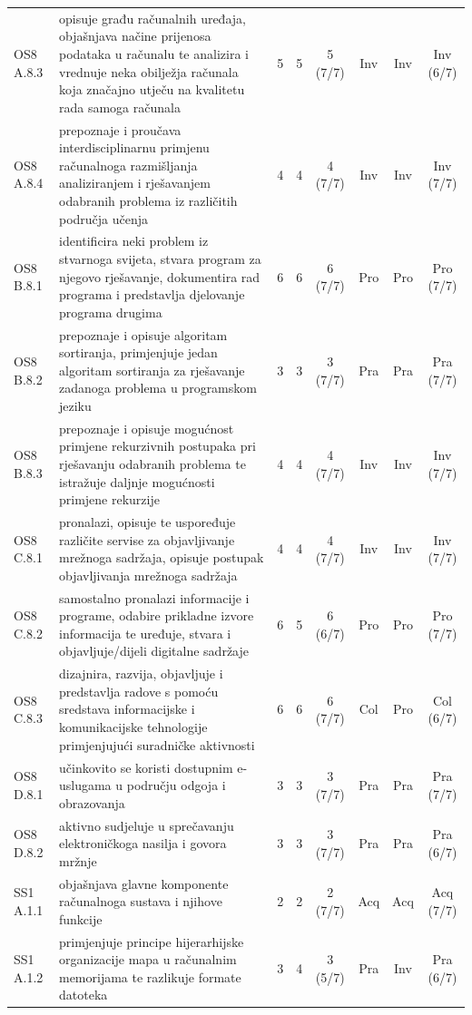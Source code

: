 \documentclass[journal,article,submit,pdftex,moreauthors]{Definitions/mdpi}
\begin{document}
{\begin{longtable}{p{1.35cm}p{6.6cm}cccccc}
OS8 A.8.3 & opisuje građu računalnih uređaja, objašnjava načine prijenosa podataka u računalu te analizira i vrednuje neka obilježja računala koja značajno utječu na kvalitetu rada samoga računala & 5 & 5 & 5 (7/7) & Inv & Inv & Inv (6/7) \\
OS8 A.8.4 & prepoznaje i proučava interdisciplinarnu primjenu računalnoga razmišljanja analiziranjem i rješavanjem odabranih problema iz različitih područja učenja & 4 & 4 & 4 (7/7) & Inv & Inv & Inv (7/7) \\
OS8 B.8.1 & identificira neki problem iz stvarnoga svijeta, stvara program za njegovo rješavanje, dokumentira rad programa i predstavlja djelovanje programa drugima & 6 & 6 & 6 (7/7) & Pro & Pro & Pro (7/7) \\
OS8 B.8.2 & prepoznaje i opisuje algoritam sortiranja, primjenjuje jedan algoritam sortiranja za rješavanje zadanoga problema u programskom jeziku & 3 & 3 & 3 (7/7) & Pra & Pra & Pra (7/7) \\
OS8 B.8.3 & prepoznaje i opisuje mogućnost primjene rekurzivnih postupaka pri rješavanju odabranih problema te istražuje daljnje mogućnosti primjene rekurzije & 4 & 4 & 4 (7/7) & Inv & Inv & Inv (7/7) \\
OS8 C.8.1 & pronalazi, opisuje te uspoređuje različite servise za objavljivanje mrežnoga sadržaja, opisuje postupak objavljivanja mrežnoga sadržaja & 4 & 4 & 4 (7/7) & Inv & Inv & Inv (7/7) \\
OS8 C.8.2 & samostalno pronalazi informacije i programe, odabire prikladne izvore informacija te uređuje, stvara i objavljuje/dijeli digitalne sadržaje & 6 & 5 & 6 (6/7) & Pro & Pro & Pro (7/7) \\
OS8 C.8.3 & dizajnira, razvija, objavljuje i predstavlja radove s pomoću sredstava informacijske i komunikacijske tehnologije primjenjujući suradničke aktivnosti & 6 & 6 & 6 (7/7) & Col & Pro & Col (6/7) \\
OS8 D.8.1 & učinkovito se koristi dostupnim e-uslugama u području odgoja i obrazovanja & 3 & 3 & 3 (7/7) & Pra & Pra & Pra (7/7) \\
OS8 D.8.2 & aktivno sudjeluje u sprečavanju elektroničkoga nasilja i govora mržnje & 3 & 3 & 3 (7/7) & Pra & Pra & Pra (6/7) \\
SS1 A.1.1 & objašnjava glavne komponente računalnoga sustava i njihove funkcije & 2 & 2 & 2 (7/7) & Acq & Acq & Acq (7/7) \\
SS1 A.1.2 & primjenjuje principe hijerarhijske organizacije mapa u računalnim memorijama te razlikuje formate datoteka & 3 & 4 & 3 (5/7) & Pra & Inv & Pra (6/7) \\

\end{longtable}}
\end{document}
